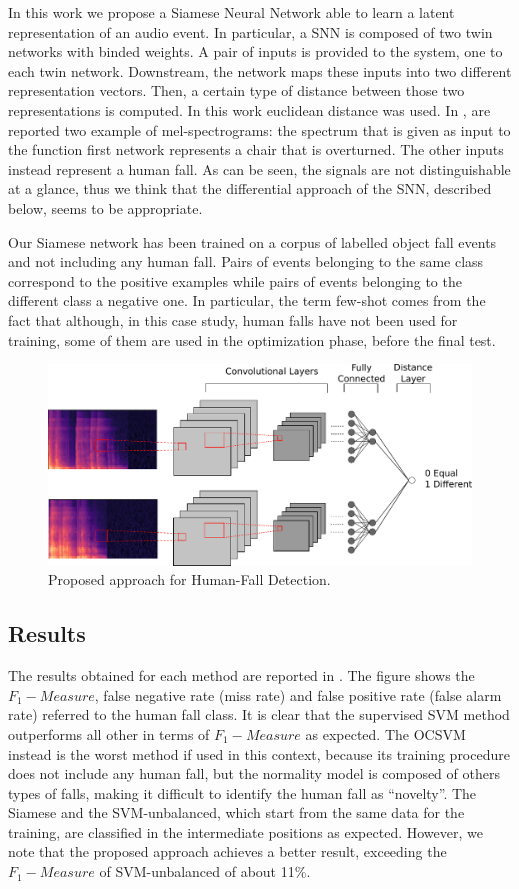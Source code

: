 In this work we propose a Siamese Neural Network able to learn a latent representation of an audio event. In particular, a SNN is composed of two twin networks with binded weights. A pair of inputs is provided to the system, one to each twin network. Downstream, the network maps these inputs into two different representation vectors. Then, a certain type of distance between those two representations is computed. In this work euclidean distance was used. In , are reported two example of mel-spectrograms: the spectrum that is given as input to the function first network represents a chair that is overturned. The other inputs instead represent a human fall. As can be seen, the signals are not distinguishable at a glance, thus we think that the differential approach of the SNN, described below, seems to be appropriate.

Our Siamese network has been trained on a corpus of labelled object fall events and not including any human fall. Pairs of events belonging to the same class correspond to the positive examples while pairs of events belonging to the different class a negative one. In particular, the term few-shot comes from the fact that although, in this case study, human falls have not been used for training, some of them are used in the optimization phase, before the final test.
\begin{figure}
	\centering
	\includegraphics[width=0.7\linewidth]{img/Siamese_approach}
	\caption[Siamese Nets for Human-Fall Detection]{Proposed approach for Human-Fall Detection.}
	\label{proposed_approach}
\end{figure}

\subsection{Results}
The results obtained for each method are reported in . The figure shows the $ F_1 -Measure$, false negative rate (miss rate) and false positive rate (false alarm rate) referred to the human fall class. It is clear that the supervised SVM method outperforms all other in terms of  $ F_1 -Measure$ as expected. The OCSVM instead is the worst method if used in this context, because its training procedure does not include any human fall, but the normality model is composed of others types of falls, making it difficult to identify the human fall as ``novelty''. The Siamese and the SVM-unbalanced, which start from the same data for the training, are classified in the intermediate positions as expected. However, we note that the proposed approach achieves a better result, exceeding the $ F_1 -Measure$ of SVM-unbalanced of about 11\%. 

